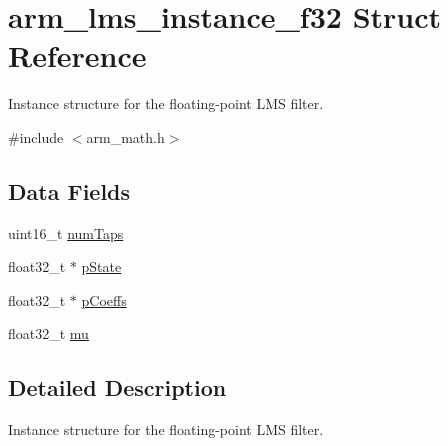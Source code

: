 \hypertarget{structarm__lms__instance__f32}{\section{arm\-\_\-lms\-\_\-instance\-\_\-f32 Struct Reference}
\label{structarm__lms__instance__f32}
}


Instance structure for the floating-\/point L\-M\-S filter.  




{\ttfamily \#include $<$arm\-\_\-math.\-h$>$}

\subsection*{Data Fields}
\begin{DoxyCompactItemize}
\item 
uint16\-\_\-t \hyperlink{structarm__lms__instance__f32_a751941891e47f522a7f5375fe8990aac}{num\-Taps}
\item 
float32\-\_\-t $\ast$ \hyperlink{structarm__lms__instance__f32_a335c87e6fdc4b96601d95a5de8b9c463}{p\-State}
\item 
float32\-\_\-t $\ast$ \hyperlink{structarm__lms__instance__f32_aacbb8dd8eeba4b21fc2bb40076405ee3}{p\-Coeffs}
\item 
float32\-\_\-t \hyperlink{structarm__lms__instance__f32_a11402afa7c9b9dac4cb953fa386e74d2}{mu}
\end{DoxyCompactItemize}


\subsection{Detailed Description}
Instance structure for the floating-\/point L\-M\-S filter. 


